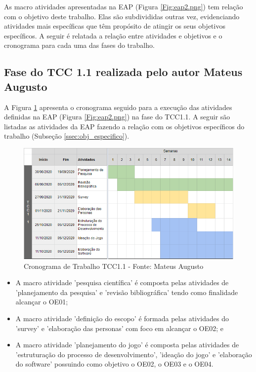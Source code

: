 {\color{textmodified}
As macro atividades apresentadas na EAP (Figura \ref{Fig:eap2.png}) tem relação com o objetivo deste trabalho. Elas são subdivididas outras vez, evidenciando atividades mais específicas que têm propósito de atingir os seus objetivos específicos. A seguir é relatada a relação entre atividades e objetivos e o cronograma para cada uma das fases do trabalho. 
}
\newpage
\subsection{\textcolor{textmodified}{Fase do TCC 1.1  realizada pelo autor Mateus Augusto}}

{\color{textadded}
A Figura \ref{Fig:cronograma_tcc1_1.png} apresenta o cronograma seguido para a execução das atividades definidas na EAP (Figura \ref{Fig:eap2.png}) na fase do TCC1.1. A seguir são listadas as atividades da EAP fazendo a relação com os objetivos específicos do trabalho (Subseção \ref{ssec:obj_especifico}).
}

\begin{figure}[htbp]
	\centering
		\includegraphics[keepaspectratio=true,scale=0.81]{figuras/cronograma_tcc1.1.png}
	\caption{\textcolor{textmodified}{Cronograma de Trabalho TCC1.1 - Fonte: Mateus Augusto}}
	\label{Fig:cronograma_tcc1_1.png}
\end{figure}

{\color{textmodified}
\begin{itemize}
    \item A macro atividade 'pesquisa científica' é composta pelas atividades de 'planejamento da pesquisa' e 'revisão bibliográfica' tendo como finalidade alcançar o OE01;
    \item A macro atividade 'definição do escopo' é formada pelas atividades do 'survey' e 'elaboração das personas' com foco em alcançar o OE02; e
    \item A macro atividade 'planejamento do jogo' é composta pelas atividades de 'estruturação do processo de desenvolvimento', 'ideação do jogo' e 'elaboração do software' possuindo como objetivo o OE02, o OE03 e o OE04.
\end{itemize}
}
\newpage
